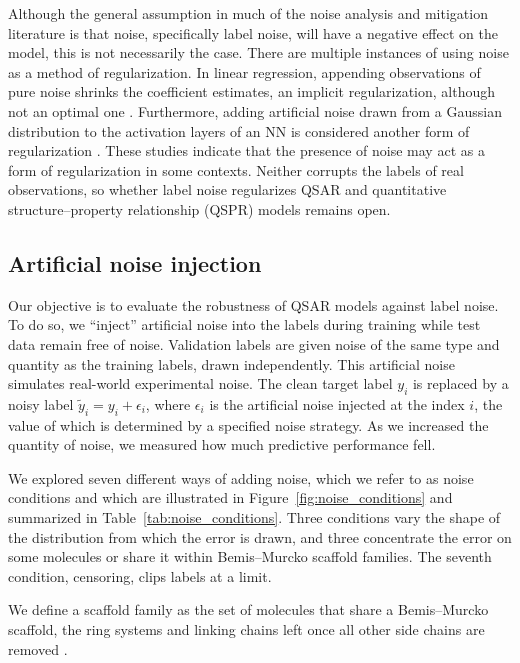 Although the general assumption in much of the noise analysis and mitigation literature is that noise, specifically label noise, will have a negative effect on the model, this is not necessarily the case. There are multiple instances of using noise as a method of regularization. In linear regression, appending observations of pure noise shrinks the coefficient estimates, an implicit regularization, although not an optimal one \citep{Ullah2024}. Furthermore, adding artificial noise drawn from a Gaussian distribution to the activation layers of an NN is considered another form of regularization \citep{Camuto2021}. These studies indicate that the presence of noise may act as a form of regularization in some contexts. Neither corrupts the labels of real observations, so whether label noise regularizes QSAR and quantitative structure--property relationship (QSPR) models remains open.

\subsection{Artificial noise injection}\label{sec:noise_injection}

Our objective is to evaluate the robustness of QSAR models against label noise. To do so, we ``inject'' artificial noise into the labels during training while test data remain free of noise. Validation labels are given noise of the same type and quantity as the training labels, drawn independently. This artificial noise simulates real-world experimental noise. The clean target label $y_i$ is replaced by a noisy label $\tilde{y}_i = y_i + \epsilon_i$, where $\epsilon_i$ is the artificial noise injected at the index $i$, the value of which is determined by a specified noise strategy. As we increased the quantity of noise, we measured how much predictive performance fell. 

We explored seven different ways of adding noise, which we refer to as noise conditions and which are illustrated in Figure~\ref{fig:noise_conditions} and summarized in Table~\ref{tab:noise_conditions}. Three conditions vary the shape of the distribution from which the error is drawn, and three concentrate the error on some molecules or share it within Bemis--Murcko scaffold families. The seventh condition, censoring, clips labels at a limit.

We define a scaffold family as the set of molecules that share a Bemis--Murcko scaffold, the ring systems and linking chains left once all other side chains are removed \citep{Bemis1996}. 

